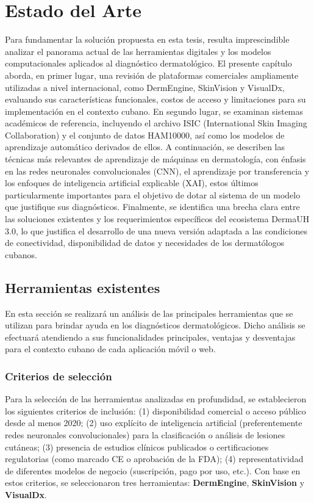 \chapter{Estado del Arte}
Para fundamentar la solución propuesta en esta tesis, resulta imprescindible analizar el 
panorama actual de las herramientas digitales y los modelos computacionales aplicados al 
diagnóstico dermatológico. El presente capítulo aborda, en primer lugar, una revisión de 
plataformas comerciales ampliamente utilizadas a nivel internacional, como DermEngine, 
SkinVision y VisualDx, evaluando sus características funcionales, costos de acceso y 
limitaciones para su implementación en el contexto cubano. En segundo lugar, se examinan 
sistemas académicos de referencia, incluyendo el archivo ISIC (International Skin 
Imaging Collaboration) y el conjunto de datos HAM10000, así como los modelos de 
aprendizaje automático derivados de ellos. A continuación, se describen las técnicas 
más relevantes de aprendizaje de máquinas en dermatología, con énfasis en las redes 
neuronales convolucionales (CNN), el aprendizaje por transferencia y los enfoques de 
inteligencia artificial explicable (XAI), estos últimos particularmente importantes 
para el objetivo de dotar al sistema de un modelo que justifique sus diagnósticos. 
Finalmente, se identifica una brecha clara entre las soluciones existentes y los 
requerimientos específicos del ecosistema DermaUH 3.0, lo que justifica el desarrollo 
de una nueva versión adaptada a las condiciones de conectividad, disponibilidad de datos 
y necesidades de los dermatólogos cubanos.

\section{Herramientas existentes}

En esta sección se realizará un análisis de las principales herramientas que se utilizan
para brindar ayuda en los diagnósticos dermatológicos. Dicho análisis se efectuará
atendiendo a sus funcionalidades principales, ventajas y desventajas para el contexto cubano de 
cada aplicación móvil o web.

\subsection*{Criterios de selección}
Para la selección de las herramientas analizadas en profundidad, se establecieron los siguientes 
criterios de inclusión: (1) disponibilidad comercial o acceso público desde al menos 2020; 
(2) uso explícito de inteligencia artificial (preferentemente redes neuronales convolucionales) 
para la clasificación o análisis de lesiones cutáneas; (3) presencia de estudios clínicos 
publicados o certificaciones regulatorias (como marcado CE o aprobación de la FDA); 
(4) representatividad de diferentes modelos de negocio (suscripción, pago por uso, etc.). 
Con base en estos criterios, se seleccionaron tres herramientas: \textbf{DermEngine}, 
\textbf{SkinVision} y \textbf{VisualDx}. 

